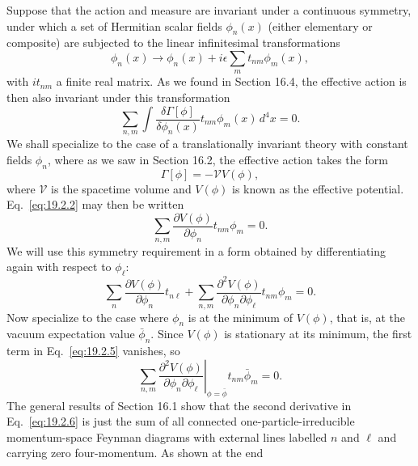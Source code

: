 Suppose that the action and measure are invariant under a continuous
symmetry, under which a set of Hermitian scalar fields $\phi_n(x)$ (either
elementary or composite) are subjected to the linear infinitesimal
transformations
\begin{equation}
 \phi_n(x)\longrightarrow\phi_n(x)
 +i\epsilon\sum_m t_{nm}\phi_m(x),
 \tag{19.2.1}\label{eq:19.2.1}
\end{equation}
with $it_{nm}$ a finite real matrix. As we found in Section 16.4, the
effective action is then also invariant under this transformation
\begin{equation}
 \sum_{n,m}\int
 \frac{\delta\Gamma[\phi]}{\delta\phi_n(x)}
 t_{nm}\phi_m(x)\,d^4x=0.
 \tag{19.2.2}\label{eq:19.2.2}
\end{equation}
We shall specialize to the case of a translationally invariant theory with
constant fields $\phi_n$, where as we saw in Section 16.2, the effective
action takes the form
\begin{equation}
 \Gamma[\phi]=-\mathcal V V(\phi),
 \tag{19.2.3}\label{eq:19.2.3}
\end{equation}
where $\mathcal V$ is the spacetime volume and $V(\phi)$ is known as the
effective potential. Eq.~\eqref{eq:19.2.2} may then be written
\begin{equation}
 \sum_{n,m}\frac{\partial V(\phi)}{\partial\phi_n}
 t_{nm}\phi_m=0.
 \tag{19.2.4}\label{eq:19.2.4}
\end{equation}
We will use this symmetry requirement in a form obtained by differentiating
again with respect to $\phi_\ell$:
\begin{equation}
 \sum_n\frac{\partial V(\phi)}{\partial\phi_n}t_{n\ell}
 +\sum_{n,m}\frac{\partial^2V(\phi)}
 {\partial\phi_n\partial\phi_\ell}t_{nm}\phi_m=0.
 \tag{19.2.5}\label{eq:19.2.5}
\end{equation}
Now specialize to the case where $\phi_n$ is at the minimum of $V(\phi)$,
that is, at the vacuum expectation value $\bar\phi_n$. Since $V(\phi)$ is
stationary at its minimum, the first term in Eq.~\eqref{eq:19.2.5} vanishes,
so
\begin{equation}
 \left.
 \sum_{n,m}\frac{\partial^2V(\phi)}
 {\partial\phi_n\partial\phi_\ell}
 \right|_{\phi=\bar\phi}
 t_{nm}\bar\phi_m=0.
 \tag{19.2.6}\label{eq:19.2.6}
\end{equation}
The general results of Section 16.1 show that the second derivative in
Eq.~\eqref{eq:19.2.6} is just the sum of all connected
one-particle-irreducible momentum-space Feynman diagrams with external lines
labelled $n$ and $\ell$ and carrying zero four-momentum. As shown at the end
